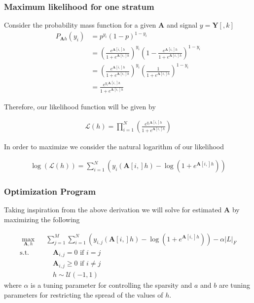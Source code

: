 \documentclass[journal]{IEEEtran}
\theoremstyle{definition}
\theoremstyle{remark}
\begin{document}
\subsubsection{Maximum likelihood for one stratum}

Consider the probability mass function for a given $\mathbf{A}$ and signal $y = \mathbf{Y}[,k]$
\begin{align}
P_{\mathbf{A}h}(y_i) &= p^{y_i}(1-p)^{1-y_i} \\
            &= \left(\frac{e^{\mathbf{A}[i,]h}}{1 + e^{\mathbf{A}[i,]h}}\right)^{y_i}\left(1- \frac{e^{\mathbf{A}[i,]h}}{1 + e^{\mathbf{A}[i,]h}}\right)^{1-y_i} \\
            &= \left(\frac{e^{\mathbf{A}[i,]h}}{1 + e^{\mathbf{A}[i,]h}}\right)^{y_i}\left(\frac{1}{1 + e^{\mathbf{A}[i,]h}}\right)^{1-y_i}   \\
            &= \frac{e^{y_i\mathbf{A}[i,]h}}{1 + e^{\mathbf{A}[i,]h}}
\end{align}

Therefore, our likelihood function will be given by 

\begin{align}
\mathcal{L}(h) = \prod_{i=1}^N\left(\frac{e^{y_i\mathbf{A}[i,]h}}{1 + e^{\mathbf{A}[i,]h}}\right)
\end{align}

In order to maximize we consider the natural logarithm of our likelihood

\begin{align}
\log(\mathcal{L}(h)) = \sum_{i=1}^N\left(y_i(\mathbf{A}[i,]h) - \log(1 + e^{\mathbf{A}[i,]h})\right)
\end{align}

\subsubsection{Optimization Program}

Taking inspiration from the above derivation we will solve for estimated $\mathbf{A}$ by maximizing the following

\begin{equation}
\label{eq:optimization}
\begin{aligned}
\max_{\mathbf{A},h} \phantom{..}& \sum_{j = 1}^M\sum_{i=1}^N\left(y_{i,j}(\mathbf{A}[i,]h) - \log(1 + e^{\mathbf{A}[i,]h})\right) - \alpha \vert L \vert _ F \\
\textrm{s.t.}  & \quad \mathbf{A}_{i,j} = 0 \text{ if } i =j \\
               & \quad \mathbf{A}_{i,j} \geq 0 \text{ if } i \neq j\\
               & \quad h \sim \mathcal{U}(-1,1) 
\end{aligned}
\end{equation}
where $\alpha$ is a tuning parameter for controlling the sparsity and $a$ and $b$ are tuning parameters for restricting the spread of the values of $h$. 
\end{document}
